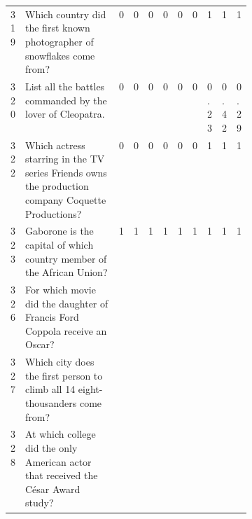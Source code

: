 \begin{longtable}{@{}lp{0.4\linewidth}lllllllll@{}}
319      & Which country did the first known photographer of snowflakes come from?                                     & \cellcolor[HTML]{FFFE65}0   & \cellcolor[HTML]{FFFE65}0    & \cellcolor[HTML]{FFFE65}0    & \cellcolor[HTML]{FFFE65}0 & \cellcolor[HTML]{FFFE65}0 & \cellcolor[HTML]{FFFE65}0 & 1                        & 1                        & 1                        \\
320      & List all the battles commanded by the lover of Cleopatra.                                                   & \cellcolor[HTML]{FFFE65}0   & \cellcolor[HTML]{FFFE65}0    & \cellcolor[HTML]{FFFE65}0    & \cellcolor[HTML]{FFFE65}0 & \cellcolor[HTML]{FFFE65}0 & \cellcolor[HTML]{FFFE65}0 & 0.23                     & 0.42                     & 0.29                     \\
322      & Which actress starring in the TV series Friends owns the production company Coquette Productions?           & \cellcolor[HTML]{FFFE65}0   & \cellcolor[HTML]{FFFE65}0    & \cellcolor[HTML]{FFFE65}0    & \cellcolor[HTML]{FFFE65}0 & \cellcolor[HTML]{FFFE65}0 & \cellcolor[HTML]{FFFE65}0 & 1                        & 1                        & 1                        \\
323      & Gaborone is the capital of which country member of the African Union?                                       & 1                           & 1                            & 1                            & 1                         & 1                         & 1                         & 1                        & 1                        & 1                        \\
326      & For which movie did the daughter of Francis Ford Coppola receive an Oscar?                                  & \cellcolor[HTML]{FE0000}   & \cellcolor[HTML]{FE0000}    & \cellcolor[HTML]{FE0000}    & \cellcolor[HTML]{FE0000} & \cellcolor[HTML]{FE0000} & \cellcolor[HTML]{FE0000} & \cellcolor[HTML]{FE0000} & \cellcolor[HTML]{FE0000} & \cellcolor[HTML]{FE0000} \\
327      & Which city does the first person to climb all 14 eight-thousanders come from?                               & \cellcolor[HTML]{BBDAFF}    & \cellcolor[HTML]{BBDAFF}     & \cellcolor[HTML]{BBDAFF}     & \cellcolor[HTML]{BBDAFF}  & \cellcolor[HTML]{BBDAFF}  & \cellcolor[HTML]{BBDAFF}  & \cellcolor[HTML]{BBDAFF} & \cellcolor[HTML]{BBDAFF} & \cellcolor[HTML]{BBDAFF} \\
328      & At which college did the only American actor that received the César Award study?                           & \cellcolor[HTML]{FE0000}   & \cellcolor[HTML]{FE0000}    & \cellcolor[HTML]{FE0000}    & \cellcolor[HTML]{FE0000} & \cellcolor[HTML]{FE0000} & \cellcolor[HTML]{FE0000} & \cellcolor[HTML]{FE0000} & \cellcolor[HTML]{FE0000} & \cellcolor[HTML]{FE0000} \\

\end{longtable}
